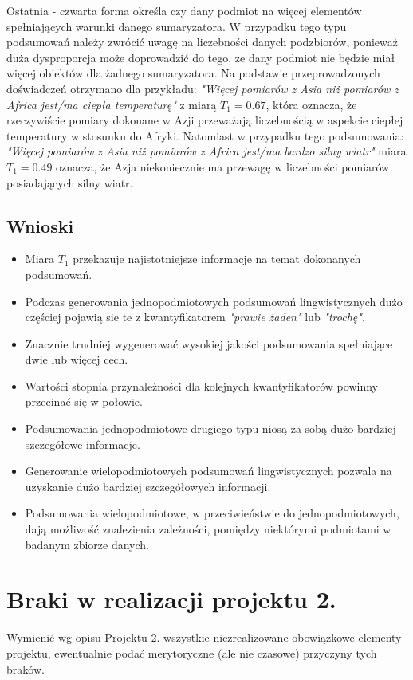 \documentclass{article}
\begin{document}
Ostatnia - czwarta forma określa czy dany podmiot na więcej elementów spełniających warunki danego sumaryzatora. W przypadku tego typu podsumowań należy zwrócić uwagę na liczebności danych podzbiorów, ponieważ duża dysproporcja może doprowadzić do tego, ze dany podmiot nie będzie miał więcej obiektów dla żadnego sumaryzatora. Na podstawie przeprowadzonych doświadczeń otrzymano dla przykładu: \textit{"Więcej pomiarów z Asia niż pomiarów z Africa jest/ma ciepła temperaturę"} z miarą \(T_1 = 0.67\), która oznacza, że rzeczywiście pomiary dokonane w Azji przeważają liczebnością w aspekcie ciepłej temperatury w stosunku do Afryki. Natomiast w przypadku tego podsumowania: \textit{"Więcej pomiarów z Asia niż pomiarów z Africa jest/ma bardzo silny wiatr"} miara \(T_1 = 0.49\) oznacza, że Azja niekoniecznie ma przewagę w liczebności pomiarów posiadających silny wiatr.

\subsection{Wnioski}
\begin{itemize}
    \item Miara \(T_1\) przekazuje najistotniejsze informacje na temat dokonanych podsumowań. 
    \item Podczas generowania jednopodmiotowych podsumowań lingwistycznych dużo częściej pojawią sie te z kwantyfikatorem \textit{"prawie żaden"} lub \textit{"trochę"}.
    \item Znacznie trudniej wygenerować wysokiej jakości podsumowania spełniające dwie lub więcej cech.
    \item Wartości stopnia przynależności dla kolejnych kwantyfikatorów powinny przecinać się w połowie.
    \item Podsumowania jednopodmiotowe drugiego typu niosą za sobą dużo bardziej szczegółowe informacje.
    \item Generowanie wielopodmiotowych podsumowań lingwistycznych pozwala na uzyskanie dużo bardziej szczegółowych informacji.
    \item Podsumowania wielopodmiotowe, w przeciwieństwie do jednopodmiotowych, dają możliwość znalezienia zależności, pomiędzy niektórymi podmiotami w badanym zbiorze danych. 
\end{itemize}


\section{Braki w realizacji projektu 2.}
Wymienić wg opisu Projektu 2. wszystkie niezrealizowane obowiązkowe elementy projektu, ewentualnie
podać merytoryczne (ale nie czasowe) przyczyny tych braków. 
\end{document}
